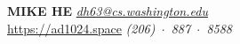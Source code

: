 \documentclass{resume}
\begin{document}

	\MakeUppercase{\Large{\textbf{Mike He}}} \hfill {\em{\href{mailto:dh63@cs.washington.edu}{dh63@cs.washington.edu}}}\\
	\vspace{-5pt}\href{https://ad1024.space}{https://ad1024.space} \hfill{\em (206)~$\cdot$~887~$\cdot$~8588}



\end{document}

